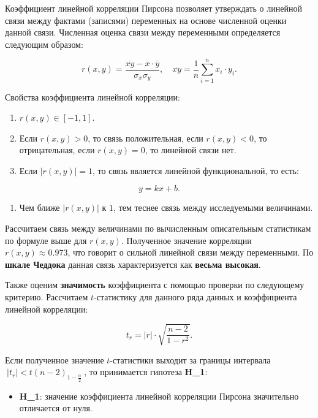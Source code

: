 \documentclass[
]{article}
\providecommand{\tightlist}{%
  \setlength{\itemsep}{0pt}\setlength{\parskip}{0pt}}
\begin{document}
Коэффициент линейной корреляции Пирсона позволяет утверждать о линейной
связи между фактами (записями) переменных на основе численной оценки
данной связи. Численная оценка связи между переменными определяется
следующим образом:

\[
r(x,  y) = \frac{\overline{xy} - \overline{x} \cdot \overline{y}}{\sigma_x \sigma_y}, \quad \overline{xy} = \frac{1}{n} \sum \limits_{i=1}^{n} x_i \cdot y_i.
\]

Свойства коэффициента линейной корреляции:

\begin{enumerate}
\def\labelenumi{\arabic{enumi}.}
\item
  \(r(x, y) \in [-1, 1].\)
\item
  Если \(r(x, y) > 0\), то связь положительная, если \(r(x,y) < 0\), то
  отрицательная, если \(r(x,y) = 0\), то линейной связи нет.
\item
  Если \(|r(x,y)| = 1\), то связь является линейной функциональной, то
  есть:
\end{enumerate}

\[y = kx + b.\]

\begin{enumerate}
\def\labelenumi{\arabic{enumi}.}
\setcounter{enumi}{3}
\tightlist
\item
  Чем ближе \(|r(x,y)|\) к \(1\), тем теснее связь между исследуемыми
  величинами.
\end{enumerate}

Рассчитаем связь между величинами по вычисленным описательным
статистикам по формуле выше для \(r(x, y)\). Полученное значение
корреляции \(r(x, y) \approx 0.973\), что говорит о сильной линейной
связи между переменными. По \textbf{шкале Чеддока} данная связь
характеризуется как \textbf{весьма высокая}.

Также оценим \textbf{значимость} коэффициента с помощью проверки по
следующему критерию. Рассчитаем \(t\)-статистику для данного ряда данных
и коэффициента линейной корреляции:

\[
t_r = |r| \cdot \sqrt{\frac{n - 2}{1 - r^2}}.
\]

Если полученное значение \(t\)-статистики выходит за границы интервала
\(\ |t_r| < t(n-2)_{1-\frac{\alpha}{2}}\ \), то принимается гипотеза
\textbf{H\_1}:

\begin{itemize}
\tightlist
\item
  \textbf{H\_1}: значение коэффициента линейной корреляции Пирсона
  значительно отличается от нуля.
\end{itemize}
\end{document}
